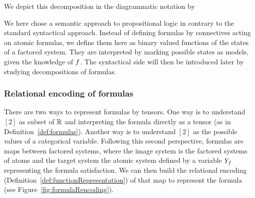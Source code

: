 We depict this decomposition in the diagrammatic notation by
\begin{center}
	
\end{center}









We here chose a semantic approach to propositional logic in contrary to the standard syntactical approach.
Instead of defining formulas by connectives acting on atomic formulas, we define them here as binary valued functions of the states of a factored system.
They are interpreted by marking possible states as models, given the knowledge of $f$.
The syntactical side will then be introduced later by studying decompositions of formulas.


%	


\subsubsection{Relational encoding of formulas}


There are two ways to represent formulas by tensors.
One way is to understand $[2]$ as subset of $\mathbb{R}$ and interpreting the formula directly as a tensor (as in Definition~\ref{def:formulas}).
Another way is to understand $[2]$ as the possible values of a categorical variable.
Following this second perspective, formulas are maps between factored systems, where the image system is the factored systems of atoms and the target system the atomic system defined by a variable $Y_{f}$ representing the formula satisfaction.
We can then build the relational encoding (Definition~\ref{def:functionRepresentation}) of that map to represent the formula (see Figure~\ref{fig:formulaRencoding}).

